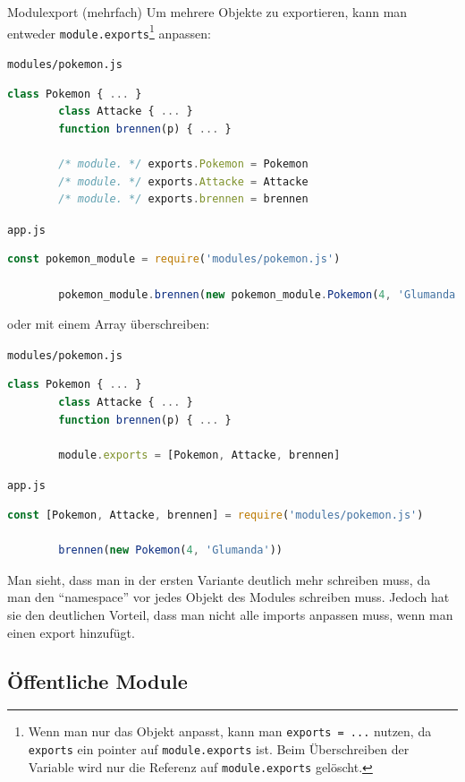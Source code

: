 \begin{example}{Modulexport (mehrfach)}
    Um mehrere Objekte zu exportieren, kann man entweder \texttt{module.exports}\footnote{
        Wenn man nur das Objekt anpasst, kann man \texttt{exports = ...} nutzen, da \texttt{exports} ein pointer auf \texttt{module.exports} ist.
        Beim Überschreiben der Variable wird nur die Referenz auf \texttt{module.exports} gelöscht.
    } anpassen:

    \texttt{modules/pokemon.js}
    \begin{lstlisting}[language=JavaScript]
        class Pokemon { ... }
        class Attacke { ... }
        function brennen(p) { ... }

        /* module. */ exports.Pokemon = Pokemon
        /* module. */ exports.Attacke = Attacke
        /* module. */ exports.brennen = brennen
    \end{lstlisting}

    \texttt{app.js}
    \begin{lstlisting}[language=JavaScript]
        const pokemon_module = require('modules/pokemon.js')

        pokemon_module.brennen(new pokemon_module.Pokemon(4, 'Glumanda'))
    \end{lstlisting}

    oder mit einem Array überschreiben:

    \texttt{modules/pokemon.js}
    \begin{lstlisting}[language=JavaScript]
        class Pokemon { ... }
        class Attacke { ... }
        function brennen(p) { ... }

        module.exports = [Pokemon, Attacke, brennen]
    \end{lstlisting}

    \texttt{app.js}
    \begin{lstlisting}[language=JavaScript]
        const [Pokemon, Attacke, brennen] = require('modules/pokemon.js')

        brennen(new Pokemon(4, 'Glumanda'))
    \end{lstlisting}

    Man sieht, dass man in der ersten Variante deutlich mehr schreiben muss, da man den \enquote{namespace} vor jedes Objekt des Modules schreiben muss.
    Jedoch hat sie den deutlichen Vorteil, dass man nicht alle imports anpassen muss, wenn man einen export hinzufügt.
\end{example}

\subsection{Öffentliche Module}

